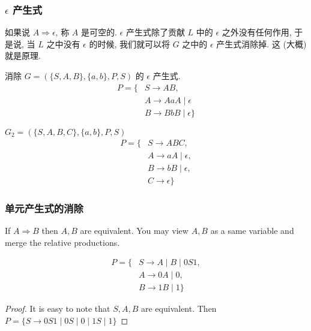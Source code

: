 \documentclass[../main.tex]{subfiles}
\begin{document}
\subsubsection{\(\epsilon\) 产生式}
如果说 \(A \Rightarrow \epsilon\), 称 \(A\) 是可空的. \( \epsilon\) 产生式除了贡献 \(L\) 中的 \( \epsilon\) 之外没有任何作用, 于是说, 当 \(L \) 之中没有 \( \epsilon\) 的时候, 我们就可以将 \(G\) 之中的 \( \epsilon\) 产生式消除掉. 这 (大概) 就是原理. 
\begin{definition}[可空变元]\label{def:可空变元}
\end{definition}

\begin{exam}
	消除 \(G = ( \{ S ,A , B \} , \{ a, b \} , P , S )\) 的 \( \epsilon\) 产生式. 
	\begin{equation}
	\begin{aligned}
		P = \{ & S \to A B  , \\ 
		       & A \to A a A \mid \epsilon \\
		       & B \to B b B \mid \epsilon \}
	\end{aligned}
	\end{equation}
\end{exam}

\begin{exam}
	\(G_{2} = ( \{ S , A  , B , C \} , \{ a, b \} , P , S )\) 
	\begin{equation}
	\begin{aligned}
		P = \{ & S \to A B C , \\ 
		       & A \to a A \mid \epsilon , \\ 
		       & B \to b B \mid \epsilon , \\
		       & C \to \epsilon \}
	\end{aligned}
	\end{equation}
\end{exam}


\subsubsection{单元产生式的消除}
If \(A \Rightarrow B\) then \(A, B\) are equivalent. You may view \(A, B\) as a same variable and merge the relative productions.

\begin{exam}
	\begin{equation}
	\begin{aligned}
		P = \{ & S \to A \mid B \mid 0S 1 , \\ 
		       & A \to 0 A \mid 0 ,  \\ 
		       & B \to 1 B \mid 1 \}
	\end{aligned}
	\end{equation}
\end{exam}
\begin{proof}
It is easy to note that \(S, A , B \) are equivalent. Then 
\(P = \{ S \to 0S1 \mid 0 S \mid 0 \mid 1 S \mid 1\}\)
\end{proof}
\end{document}
